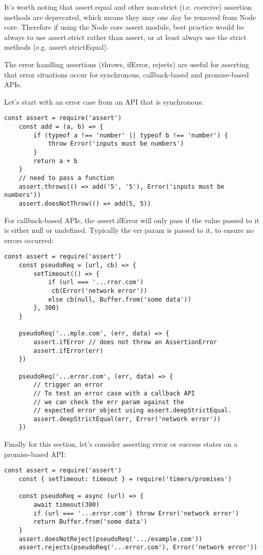 \documentclass{scrartcl}
\begin{document}
It's worth noting that assert.equal and other non-strict (i.e. coercive) assertion methods are deprecated, which means they may one day be removed from Node core. Therefore if using the Node core assert module, best practice would be always to use assert.strict rather than assert, or at least always use the strict methods (e.g. assert.strictEqual).

The error handling assertions (throws, ifError, rejects) are useful for asserting that error situations occur for synchronous, callback-based and promise-based APIs.

Let's start with an error case from an API that is synchronous:

\begin{lstlisting}[style=ES6]
    const assert = require('assert')
    const add = (a, b) => {
        if (typeof a !== 'number' || typeof b !== 'number') {
            throw Error('inputs must be numbers')
        }
        return a + b
    }
    // need to pass a function
    assert.throws(() => add('5', '5'), Error('inputs must be numbers'))
    assert.doesNotThrow(() => add(5, 5))
\end{lstlisting}

For callback-based APIs, the assert.ifError will only pass if the value passed to it is either null or undefined. Typically the err param is passed to it, to ensure no errors occurred:

\begin{lstlisting}[style=ES6]
    const assert = require('assert')
    const pseudoReq = (url, cb) => {
        setTimeout(() => {
            if (url === '...rror.com')
             cb(Error('network error'))
            else cb(null, Buffer.from('some data'))
        }, 300)
    }

    pseudoReq('...mple.com', (err, data) => {
        assert.ifError // does not throw an AssertionError
        assert.ifError(err)
    })

    pseudoReq('...error.com', (err, data) => {
        // trigger an error
        // To test an error case with a callback API
        // we can check the err param against the
        // expected error object using assert.deepStrictEqual.
        assert.deepStrictEqual(err, Error('network error'))
    })
\end{lstlisting}

Finally for this section, let's consider asserting error or success states on a promise-based API:

\begin{lstlisting}[style=ES6]
    const assert = require('assert')
    const { setTimeout: timeout } = require('timers/promises')

    const pseudoReq = async (url) => {
        await timeout(300)
        if (url === '...error.com') throw Error('network error')
        return Buffer.from('some data')
    }
    assert.doesNotReject(pseudoReq('.../example.com'))
    assert.rejects(pseudoReq('...error.com'), Error('network error'))

\end{lstlisting}
\end{document}
